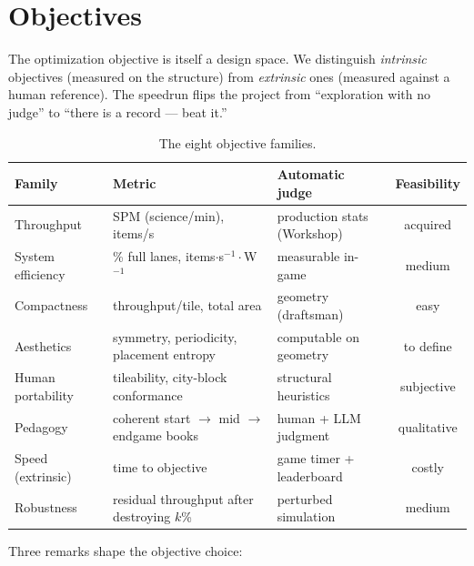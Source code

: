 \documentclass[11pt,a4paper]{article}
\begin{document}
\section{Objectives}
\label{sec:objectives}

The optimization objective is itself a design space. We distinguish
\emph{intrinsic} objectives (measured on the structure) from \emph{extrinsic}
ones (measured against a human reference). The speedrun flips the project from
``exploration with no judge'' to ``there is a record --- beat it.''

\begin{table}[htbp]
\centering
\caption{The eight objective families.}
\label{tab:objectives}
\small
\renewcommand{\arraystretch}{1.2}
\begin{tabularx}{\textwidth}{@{}l X l c@{}}
\toprule
\textbf{Family} & \textbf{Metric} & \textbf{Automatic judge} & \textbf{Feasibility}\\
\midrule
Throughput            & SPM (science/min), items/s & production stats (Workshop) & acquired\\
System efficiency     & \% full lanes, items$\cdot$s$^{-1}\cdot$W$^{-1}$ & measurable in-game & medium\\
Compactness           & throughput/tile, total area & geometry (draftsman) & easy\\
Aesthetics            & symmetry, periodicity, placement entropy & computable on geometry & to define\\
Human portability     & tileability, city-block conformance & structural heuristics & subjective\\
Pedagogy              & coherent start $\rightarrow$ mid $\rightarrow$ endgame books & human + LLM judgment & qualitative\\
Speed (extrinsic)     & time to objective & game timer + leaderboard & costly\\
Robustness            & residual throughput after destroying $k$\% & perturbed simulation & medium\\
\bottomrule
\end{tabularx}
\end{table}

Three remarks shape the objective choice:
\end{document}
